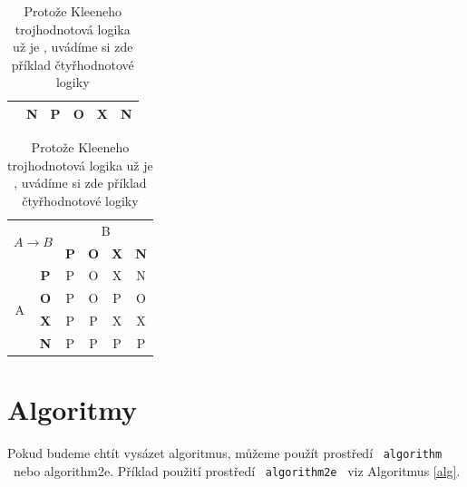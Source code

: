 \documentclass[11pt]{article}
\begin{document}
\begin{table}[h!]
\begin{tabular}{|c|c|c|c|c|c|}
                                    & \textbf{N}       & P          & O          & X          & N          \\ \hline
    \end{tabular}
    \begin{tabular}{|c|c|c|c|c|c|}
        \hline
        \multicolumn{2}{|c|}{\multirow{2}{*}{$A \rightarrow B$}} & \multicolumn{4}{c|}{B}                            \\ \cline{3-6} 
        \multicolumn{2}{|c|}{}                      & \textbf{P} & \textbf{O} & \textbf{X} & \textbf{N} \\ \hline
        \multirow{4}{*}{A}       & \textbf{P}       & P          & O          & X          & N          \\ \cline{2-6} 
                                    & \textbf{O}       & P          & O          & P          & O          \\ \cline{2-6} 
                                    & \textbf{X}       & P          & P          & X          & X          \\ \cline{2-6} 
                                    & \textbf{N}       & P          & P          & P          & P          \\ \hline
    \end{tabular}
    \caption{Protože Kleeneho trojhodnotová logika už je , uvádíme si zde příklad čtyřhodnotové logiky}
    \label{Tab2}
\end{table}




\newpage
\section{Algoritmy}
\label{Algoritmy}
Pokud budeme chtít vysázet algoritmus, můžeme použít prostředí \ \texttt{algorithm\footnotemark} \ nebo 
{algorithm2e\footnotemark}.
Příklad použití prostředí \ \texttt{algorithm2e} \ viz Algoritmus \ref{alg}.
\end{document}
